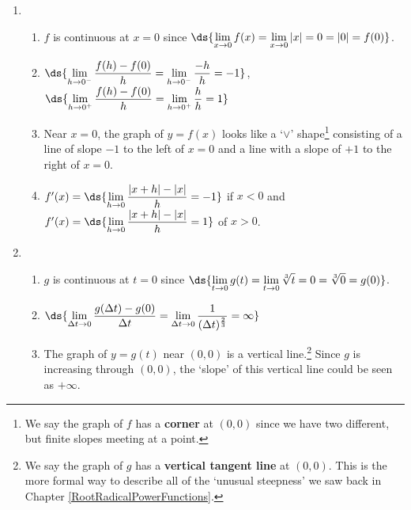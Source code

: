 \documentclass{ximera}
\begin{document}
\begin{enumerate}
\setcounter{enumi}{\value{HW}}

\item \begin{enumerate} \item  $f$ is continuous at $x=0$ since $\ds{\lim_{x \rightarrow 0} f(x) = \lim_{x \rightarrow 0} |x| = 0 = |0| = f(0)}$.

\smallskip

\item   $\ds{\lim_{h \rightarrow 0^{-}} \dfrac{f(h) - f(0)}{h} = \lim_{h \rightarrow 0^{-}} \dfrac{-h}{h}  =-1}$,  $\ds{\lim_{h \rightarrow 0^{+}} \dfrac{f(h) - f(0)}{h} = \lim_{h \rightarrow 0^{+}} \dfrac{h}{h}  = 1}$

\smallskip
        
\item  Near $x = 0$, the graph of $y = f(x)$ looks like a `$\vee$' shape\footnote{We say the graph of $f$ has a  \textbf{corner} at $(0,0)$ since we have two different, but finite slopes meeting at a point.} consisting of a line of slope $-1$ to the left of $x=0$ and a line with a slope of $+1$ to the right of $x = 0$.

\smallskip

\item  $f'(x) =  \ds{\lim_{h \rightarrow 0} \dfrac{|x+h| - |x|}{h} = -1}$ if $x < 0$ and $f'(x) =  \ds{\lim_{h \rightarrow 0} \dfrac{|x+h| - |x|}{h} = 1}$ of $x > 0$.

\smallskip

\end{enumerate}



\item \begin{enumerate}

\item  $g$ is continuous at $t=0$ since $\ds{\lim_{t \rightarrow 0} g(t) = \lim_{t \rightarrow 0} \sqrt[3]{t} = 0 = \sqrt[3]{0} = g(0)}$.

\smallskip

\item $\ds{\lim_{\Delta t \rightarrow 0} \dfrac{g(\Delta t) - g(0)}{\Delta t} =   \lim_{\Delta t \rightarrow 0} \dfrac{1}{(\Delta t)^{\frac{2}{3}}}   =  \infty}$

\smallskip

        
\item  The graph of $y = g(t)$ near $(0,0)$ is a vertical line.\footnote{We say the graph of $g$ has a  \textbf{vertical tangent line} at $(0,0)$.  This is the more formal way to describe all of the `unusual steepness' we saw back in Chapter \ref{RootRadicalPowerFunctions}.}  Since $g$ is increasing through $(0,0)$, the `slope' of this vertical line could be seen as $+ \infty$. 


\end{enumerate}
\end{enumerate}
\end{document}

